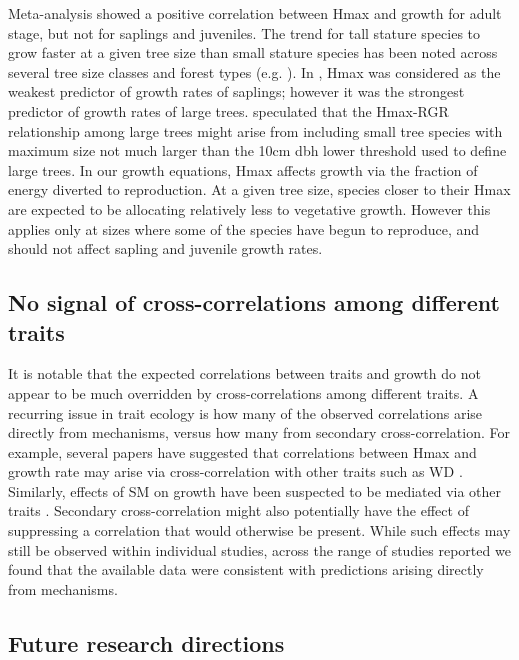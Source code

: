 \documentclass[a4paper,11pt]{article}
\begin{document}
Meta-analysis showed a positive correlation between Hmax and growth for adult stage, but not for saplings and juveniles. The trend for tall stature species to grow faster at a given tree size than small stature species has been noted across several tree size classes and forest types (e.g. \citealt{Poorter:2008iu,Wright:2010tp,Herault:2011dd,Ruger:2012jv,Iida:2014ep}). In \citet{Wright:2010tp}, Hmax was considered as the weakest predictor of growth rates of saplings; however it was the strongest predictor of growth rates of large trees. \citet{Poorter:2008iu} speculated that the Hmax-RGR relationship among large trees might arise from including small tree species with maximum size not much larger than the  10cm dbh lower threshold used to define large trees. In our growth equations, Hmax affects growth via the fraction of energy diverted to reproduction. At a given tree size, species closer to their Hmax are expected to be allocating relatively less to vegetative growth. However this applies only at sizes where some of the species have begun to reproduce, and should not affect sapling and juvenile growth rates.

\subsection*{No signal of cross-correlations among different traits}

It is notable that the expected correlations between traits and growth do not appear to be much overridden by cross-correlations among different traits. A recurring issue in trait ecology is how many of the observed correlations arise directly from mechanisms, versus how many from secondary cross-correlation. For example, several papers have suggested that correlations between Hmax and growth rate may arise via cross-correlation with other traits such as WD \citep{Thomas:1996do, Poorter:2006vb, Wright:2010tp}. Similarly, effects of SM on growth have been suspected to be mediated via other traits \citep{Shipley:1990js,Westoby:2002ft,Poorter:2006vb}. Secondary cross-correlation might also potentially have the effect of suppressing a correlation that would otherwise be present. While such effects may still be observed within individual studies, across the range of studies reported we found that the available data were consistent with predictions arising directly from mechanisms.

\subsection*{Future research directions}
\end{document}
